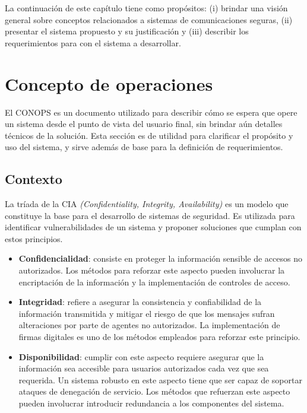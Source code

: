 La continuación de este capítulo tiene como propósitos: (i) brindar una visión general sobre conceptos relacionados a sistemas de comunicaciones seguras, (ii) presentar el sistema propuesto y su justificación y (iii) describir los requerimientos para con el sistema a desarrollar.

\clearpage

\section{Concepto de operaciones}
El CONOPS es un documento utilizado para describir cómo se espera que opere un sistema desde el punto de vista del usuario final, sin brindar aún detalles técnicos de la solución. Esta sección es de utilidad para clarificar el propósito y uso del sistema, y  sirve además de base para la definición de requerimientos.

\subsection{Contexto}

La tríada de la CIA \textit{(Confidentiality, Integrity, Availability)} es un modelo que constituye la base para el desarrollo de sistemas de seguridad. Es utilizada para identificar vulnerabilidades de un sistema y proponer soluciones que cumplan con estos principios. 
\begin{itemize}
    \item \textbf{Confidencialidad}: consiste en proteger la información sensible de accesos no autorizados. Los métodos para reforzar este aspecto pueden involucrar la encriptación de la información y la implementación de controles de acceso.
    \item \textbf{Integridad}: refiere a asegurar la consistencia y confiabilidad de la información transmitida y mitigar el riesgo de que los mensajes sufran alteraciones por parte de agentes no autorizados. La implementación de firmas digitales es uno de los métodos empleados para reforzar este principio.
    \item \textbf{Disponibilidad}: cumplir con este aspecto requiere asegurar que la información sea accesible para usuarios autorizados cada vez que sea requerida. Un sistema robusto en este aspecto tiene que ser capaz de soportar ataques de denegación de servicio. Los métodos que refuerzan este aspecto pueden involucrar introducir redundancia a los componentes del sistema.
\end{itemize}


